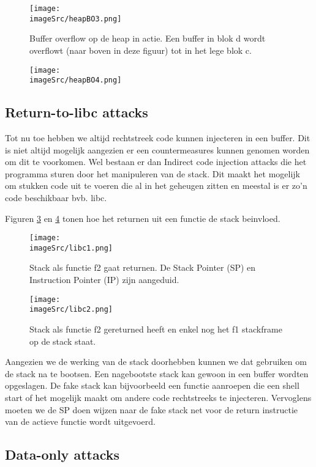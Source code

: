 \documentclass[../main.tex]{subfiles}
\begin{document}
\begin{figure}
\centering
\texttt{[image: \\imageSrc/heapBO3.png]}
\caption{Buffer overflow op de heap in actie. Een buffer in blok d wordt overflowt (naar boven in deze figuur) tot in het lege blok c.}
\label{f:heapBO3}
\end{figure}

\begin{figure}
\centering
\texttt{[image: \\imageSrc/heapBO4.png]}
\caption{}
\label{f:heapBO4}
\end{figure}
\subsection{Return-to-libc attacks}
Tot nu toe hebben we altijd rechtstreek code kunnen injecteren in een buffer.
Dit is niet altijd mogelijk aangezien er een countermeasures kunnen genomen worden om dit te voorkomen.
Wel bestaan er dan Indirect code injection attacks die het programma sturen door het manipuleren van de stack.
Dit maakt het mogelijk om stukken code uit te voeren die al in het geheugen zitten en meestal is er zo'n code beschikbaar bvb. libc.

Figuren \ref{f:libc1} en \ref{f:libc2} tonen hoe het returnen uit een functie de stack beinvloed.
\begin{figure}
\centering
\texttt{[image: \\imageSrc/libc1.png]}
\caption{Stack als functie f2 gaat returnen. De Stack Pointer (SP) en Instruction Pointer (IP) zijn aangeduid.}
\label{f:libc1}
\end{figure}

\begin{figure}
\centering
\texttt{[image: \\imageSrc/libc2.png]}
\caption{Stack als functie f2 gereturned heeft en enkel nog het f1 stackframe op de stack staat.}
\label{f:libc2}
\end{figure}

Aangezien we de werking van de stack doorhebben kunnen we dat gebruiken om de stack na te bootsen.
Een nagebootste stack kan gewoon in een buffer wordten opgeslagen.
De fake stack kan bijvoorbeeld een functie aanroepen die een shell start of het mogelijk maakt om andere code rechtstreeks te injecteren.
Vervoglens moeten we de SP doen wijzen naar de fake stack net voor de return instructie van de actieve functie wordt uitgevoerd.



\subsection{Data-only attacks}
\end{document}
